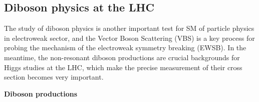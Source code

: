 \subsection{Diboson physics at the LHC}
\label{diboson}

The study of diboson physics is another important test for SM of particle physics in electroweak sector, 
and the Vector Boson Scattering (VBS) is a key process for probing the mechanism of the electroweak symmetry breaking (EWSB).
In the meantime, the non-resonant diboson productions are crucial backgrounds for Higgs studies at the LHC, which make the precise measurement of their cross section becomes very important.

\textbf{Diboson productions}

